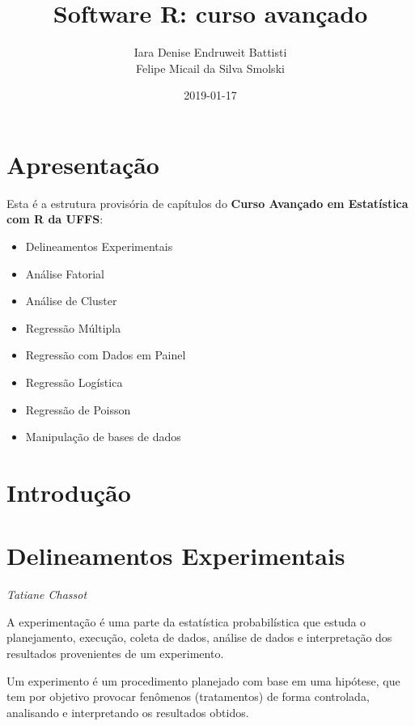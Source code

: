 \documentclass[12pt,brazil,oneside]{book}
\title{Software R: curso avançado}
\author{Iara Denise Endruweit Battisti \\ Felipe Micail da Silva Smolski}
\date{2019-01-17}
\providecommand{\tightlist}{%
  \setlength{\itemsep}{0pt}\setlength{\parskip}{0pt}}
\begin{document}
\maketitle

{
\setcounter{tocdepth}{1}
\tableofcontents
}
\hypertarget{apresentacao}{%
\chapter*{Apresentação}\label{apresentacao}}

\frenchspacing

Esta é a estrutura provisória de capítulos do \textbf{Curso Avançado em Estatística com R da UFFS}:

\begin{itemize}
\tightlist
\item
  Delineamentos Experimentais
\item
  Análise Fatorial
\item
  Análise de Cluster
\item
  Regressão Múltipla
\item
  Regressão com Dados em Painel
\item
  Regressão Logística
\item
  Regressão de Poisson
\item
  Manipulação de bases de dados
\end{itemize}

\hypertarget{introducao}{%
\chapter*{Introdução}\label{introducao}}

\hypertarget{delineamentos-experimentais}{%
\chapter{Delineamentos Experimentais}\label{delineamentos-experimentais}}

\emph{Tatiane Chassot}

A experimentação é uma parte da estatística probabilística que estuda o planejamento, execução, coleta de dados, análise de dados e interpretação dos resultados provenientes de um experimento.

Um experimento é um procedimento planejado com base em uma hipótese, que tem por objetivo provocar fenômenos (tratamentos) de forma controlada, analisando e interpretando os
resultados obtidos.
\end{document}
